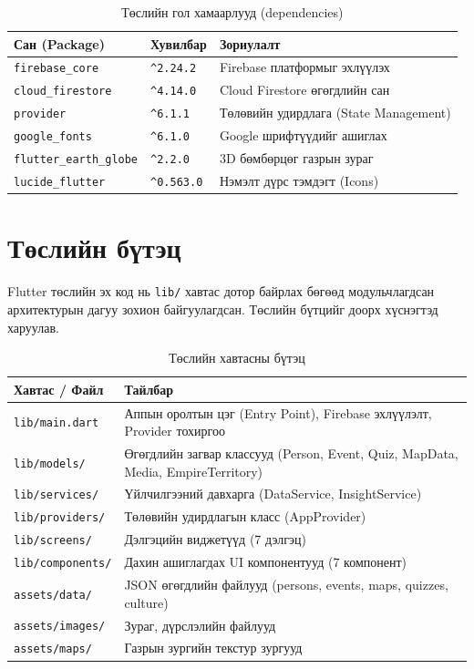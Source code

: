 \begin{table}[htbp]
\centering
\begin{tabular}{|p{4cm}|p{2.5cm}|p{7cm}|}
\hline
\textbf{Сан (Package)} & \textbf{Хувилбар} & \textbf{Зориулалт} \\
\hline
\texttt{firebase\_core} & \texttt{\^{}2.24.2} & Firebase платформыг эхлүүлэх \\
\hline
\texttt{cloud\_firestore} & \texttt{\^{}4.14.0} & Cloud Firestore өгөгдлийн сан \\
\hline
\texttt{provider} & \texttt{\^{}6.1.1} & Төлөвийн удирдлага (State Management) \\
\hline
\texttt{google\_fonts} & \texttt{\^{}6.1.0} & Google шрифтүүдийг ашиглах \\
\hline
\texttt{flutter\_earth\_globe} & \texttt{\^{}2.2.0} & 3D бөмбөрцөг газрын зураг \\
\hline
\texttt{lucide\_flutter} & \texttt{\^{}0.563.0} & Нэмэлт дүрс тэмдэгт (Icons) \\
\hline
\end{tabular}
\caption{Төслийн гол хамаарлууд (dependencies)}
\label{tab:dependencies}
\end{table}

\section{Төслийн бүтэц}

Flutter төслийн эх код нь \texttt{lib/} хавтас дотор байрлах бөгөөд модульчлагдсан архитектурын дагуу зохион байгуулагдсан. Төслийн бүтцийг доорх хүснэгтэд харуулав.

\begin{table}[htbp]
\centering
\begin{tabular}{|p{4cm}|p{9.5cm}|}
\hline
\textbf{Хавтас / Файл} & \textbf{Тайлбар} \\
\hline
\texttt{lib/main.dart} & Аппын оролтын цэг (Entry Point), Firebase эхлүүлэлт, Provider тохиргоо \\
\hline
\texttt{lib/models/} & Өгөгдлийн загвар классууд (Person, Event, Quiz, MapData, Media, EmpireTerritory) \\
\hline
\texttt{lib/services/} & Үйлчилгээний давхарга (DataService, InsightService) \\
\hline
\texttt{lib/providers/} & Төлөвийн удирдлагын класс (AppProvider) \\
\hline
\texttt{lib/screens/} & Дэлгэцийн виджетүүд (7 дэлгэц) \\
\hline
\texttt{lib/components/} & Дахин ашиглагдах UI компонентууд (7 компонент) \\
\hline
\texttt{assets/data/} & JSON өгөгдлийн файлууд (persons, events, maps, quizzes, culture) \\
\hline
\texttt{assets/images/} & Зураг, дүрслэлийн файлууд \\
\hline
\texttt{assets/maps/} & Газрын зургийн текстур зургууд \\
\hline
\end{tabular}
\caption{Төслийн хавтасны бүтэц}
\label{tab:project_structure}
\end{table}

